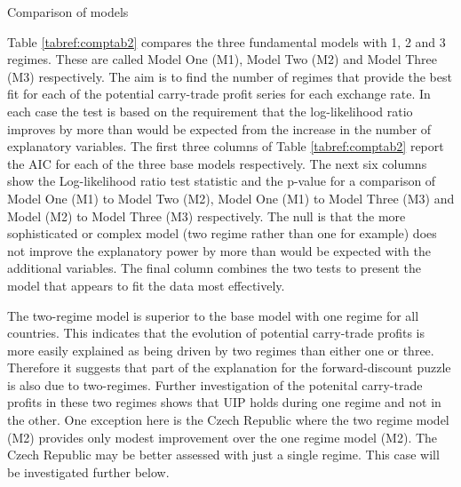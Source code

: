 \documentclass[12pt, a4paper, oneside]{article}\usepackage[]{graphicx}\usepackage[]{color}
\begin{document}
\begin{sidewaystable}[p]
\begin{threeparttable}
\begin{tablenotes}
\end{tablenotes}
\caption{Comparison of models}
\label{tabref:comptab2}
\end{threeparttable}
\end{sidewaystable}

Table \ref{tabref:comptab2} compares the three fundamental models with 1, 2 and 3 regimes. These are called Model One (M1), Model Two (M2) and Model Three (M3) respectively.  The aim is to find the number of regimes that provide the best fit for each of the potential carry-trade profit series for each exchange rate.  In each case the test is based on the requirement that the log-likelihood ratio improves by more than would be expected from the increase in the number of explanatory variables.  The first three columns of Table \ref{tabref:comptab2} report the AIC for each of the three base models respectively. The next six columns show the Log-likelihood ratio test statistic and the p-value for a comparison of Model One (M1) to Model Two (M2), Model One (M1) to Model Three (M3) and Model (M2) to Model Three (M3) respectively. The null is that the more sophisticated or complex model (two regime rather than one for example) does not improve the explanatory power by more than would be expected with the additional variables. The final column combines the two tests to present the model that appears to fit the data most effectively. 

The two-regime model is superior to the base model with one regime for all countries. This indicates that the evolution of potential carry-trade profits is more easily explained as being driven by two regimes than either one or three.  Therefore it suggests that part of the explanation for the forward-discount puzzle is also due to two-regimes.  Further investigation of the potenital carry-trade profits in these two regimes shows that UIP holds during one regime and not in the other.  One exception here is the Czech Republic where the two regime model (M2) provides only modest improvement over the one regime model (M2).   The Czech Republic may be better assessed with just a single regime. This case will be investigated further below. 
\end{document}
